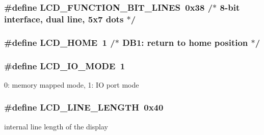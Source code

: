 \subsubsection[{\texorpdfstring{L\+C\+D\+\_\+\+F\+U\+N\+C\+T\+I\+O\+N\+\_\+8\+B\+I\+T\+\_\+2\+L\+I\+N\+ES}{LCD_FUNCTION_8BIT_2LINES}}]{\setlength{\rightskip}{0pt plus 5cm}\#define L\+C\+D\+\_\+\+F\+U\+N\+C\+T\+I\+O\+N\+\_\+B\+I\+T\+\_\+L\+I\+N\+ES~0x38   /$\ast$ 8-\/bit interface, dual line,   5x7 dots $\ast$/}\hypertarget{group__pfleury__lcd_ga160a214f47869f8f98ad5add3a7568db}{}\label{group__pfleury__lcd_ga160a214f47869f8f98ad5add3a7568db}
\subsubsection[{\texorpdfstring{L\+C\+D\+\_\+\+H\+O\+ME}{LCD_HOME}}]{\setlength{\rightskip}{0pt plus 5cm}\#define L\+C\+D\+\_\+\+H\+O\+ME~1      /$\ast$ D\+B1\+: return to home position        $\ast$/}\hypertarget{group__pfleury__lcd_gae0e309ccad89222eb3457f2da9f2bb8d}{}\label{group__pfleury__lcd_gae0e309ccad89222eb3457f2da9f2bb8d}
\subsubsection[{\texorpdfstring{L\+C\+D\+\_\+\+I\+O\+\_\+\+M\+O\+DE}{LCD_IO_MODE}}]{\setlength{\rightskip}{0pt plus 5cm}\#define L\+C\+D\+\_\+\+I\+O\+\_\+\+M\+O\+DE~1}\hypertarget{group__pfleury__lcd_ga659fcdf979f69bbd14f852f525f25e02}{}\label{group__pfleury__lcd_ga659fcdf979f69bbd14f852f525f25e02}
0\+: memory mapped mode, 1\+: IO port mode 
\subsubsection[{\texorpdfstring{L\+C\+D\+\_\+\+L\+I\+N\+E\+\_\+\+L\+E\+N\+G\+TH}{LCD_LINE_LENGTH}}]{\setlength{\rightskip}{0pt plus 5cm}\#define L\+C\+D\+\_\+\+L\+I\+N\+E\+\_\+\+L\+E\+N\+G\+TH~0x40}\hypertarget{group__pfleury__lcd_gae59a728d9dee9f12c817b29d38746ed9}{}\label{group__pfleury__lcd_gae59a728d9dee9f12c817b29d38746ed9}
internal line length of the display 

